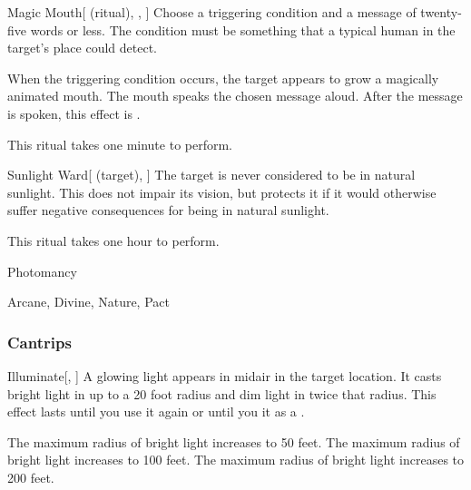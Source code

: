 \lowercase{\hypertarget{spell:Magic Mouth}{}}\label{spell:Magic Mouth}
\begin{attuneability}[Rank 1]{\hypertarget{spell:Magic Mouth}{Magic Mouth}}[ (ritual), , ]
Choose a triggering condition and a message of twenty-five words or less.
The condition must be something that a typical human in the target's place could detect.

When the triggering condition occurs, the target appears to grow a magically animated mouth.
The mouth speaks the chosen message aloud.
After the message is spoken, this effect is .

This ritual takes one minute to perform.
\end{attuneability}
\vspace{0.25em}



\lowercase{\hypertarget{spell:Sunlight Ward}{}}\label{spell:Sunlight Ward}
\begin{attuneability}[Rank 3]{\hypertarget{spell:Sunlight Ward}{Sunlight Ward}}[ (target), ]
The target is never considered to be in natural sunlight.
This does not impair its vision, but protects it if it would otherwise suffer negative consequences for being in natural sunlight.

This ritual takes one hour to perform.
\end{attuneability}
\vspace{0.25em}


\newpage
\begin{spellsection}{Photomancy}

\begin{spellheader}
\end{spellheader}


 Arcane, Divine, Nature, Pact

\subsubsection{Cantrips}


\begin{freeability}{Illuminate}[, ]
A glowing light appears in midair in the target location.
It casts bright light in up to a 20 foot radius and dim light in twice that radius.
This effect lasts until you use it again or until you  it as a .

\rankline
{} The maximum radius of bright light increases to 50 feet.
 The maximum radius of bright light increases to 100 feet.
 The maximum radius of bright light increases to 200 feet.
\end{freeability}

\end{spellsection}


